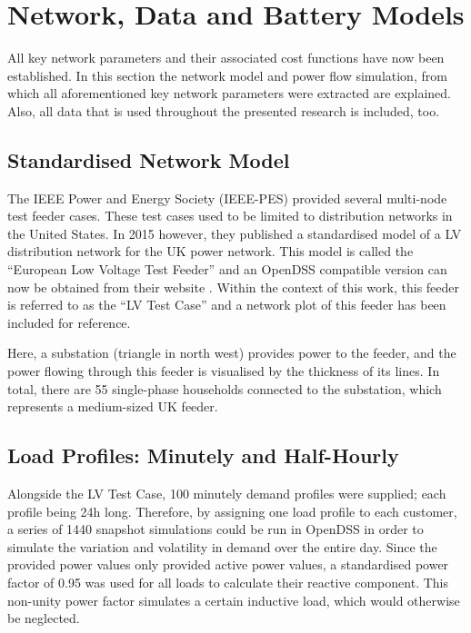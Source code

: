 \section{Network, Data and Battery Models}
\label{ch1:sec:data-and-network-models}

All key network parameters and their associated cost functions have now been established.
In this section the network model and power flow simulation, from which all aforementioned key network parameters were extracted are explained.
Also, all data that is used throughout the presented research is included, too.

\subsection{Standardised Network Model}
\label{ch1:subsec:standardised-network-model}

The IEEE Power and Energy Society (IEEE-PES) provided several multi-node test feeder cases.
These test cases used to be limited to distribution networks in the United States.
In 2015 however, they published a standardised model of a LV distribution network for the UK power network.
This model is called the ``European Low Voltage Test Feeder'' and an OpenDSS compatible version can now be obtained from their website \cite{DistributionTestFeeders2017}.
Within the context of this work, this feeder is referred to as the ``LV Test Case'' and a network plot of this feeder has been included for reference.



Here, a substation (triangle in north west) provides power to the feeder, and the power flowing through this feeder is visualised by the thickness of its lines.
In total, there are 55 single-phase households connected to the substation, which represents a medium-sized UK feeder.

\subsection{Load Profiles: Minutely and Half-Hourly}

Alongside the LV Test Case, 100 minutely demand profiles were supplied; each profile being 24h long.
Therefore, by assigning one load profile to each customer, a series of 1440 snapshot simulations could be run in OpenDSS in order to simulate the variation and volatility in demand over the entire day.
Since the provided power values only provided active power values, a standardised power factor of 0.95 was used for all loads to calculate their reactive component.
This non-unity power factor simulates a certain inductive load, which would otherwise be neglected.


